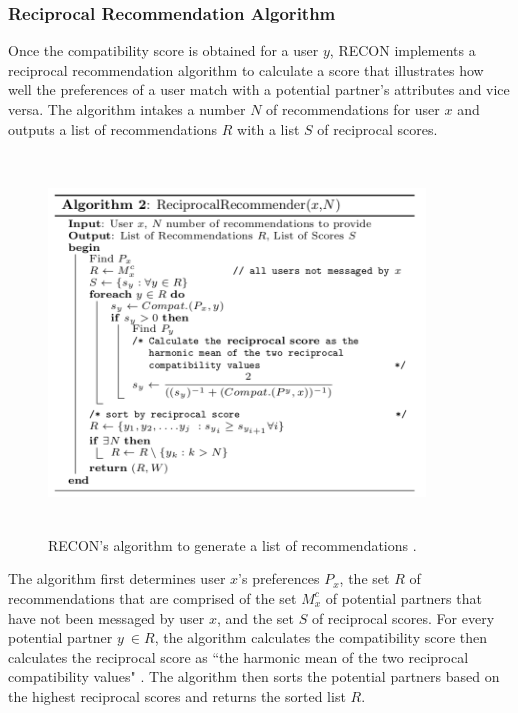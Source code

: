 \documentclass[11pt]{article}
\begin{document}
 \subsubsection{Reciprocal Recommendation Algorithm}
  Once the compatibility score is obtained for a user $y$, RECON implements a reciprocal recommendation algorithm to calculate a score that illustrates how well the preferences of a user match with a potential partner's attributes and vice versa. The algorithm intakes a number $N$ of recommendations for user $x$ and outputs a list of recommendations $R$ with a list $S$ of reciprocal scores.

\begin{figure}[h]
\begin{center}
\includegraphics[width=10cm,height=10cm,keepaspectratio]{Recon_Alg2.png} 
\caption{RECON's algorithm to generate a list of recommendations \cite{RECON}.}    
\end{center}
\end{figure}

\indent The algorithm first determines user $x$'s preferences $P_x$, the set $R$ of recommendations that are comprised of the set $M_x^c$ of potential partners that have not been messaged by user $x$, and the set $S$ of reciprocal scores. For every potential partner $y\ \in R$, the algorithm calculates the compatibility score then calculates the reciprocal score as ``the harmonic mean of the two reciprocal compatibility values" \cite{RECON}. The algorithm then sorts the potential partners based on the highest reciprocal scores and returns the sorted list $R$.
\end{document}

